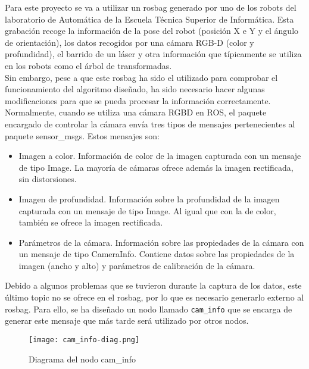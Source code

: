 Para este proyecto se va a utilizar un rosbag generado por uno de los robots del laboratorio de Automática de la Escuela Técnica Superior de Informática. Esta grabación recoge la información de la pose del robot (posición X e Y y el ángulo de orientación), los datos recogidos por una cámara RGB-D (color y profundidad), el barrido de un láser y otra información que típicamente se utiliza en los robots como el árbol de transformadas.\\

Sin embargo, pese a que este rosbag ha sido el utilizado para comprobar el funcionamiento del algoritmo diseñado, ha sido necesario hacer algunas modificaciones para que se pueda procesar la información correctamente.\\

Normalmente, cuando se utiliza una cámara RGBD en ROS, el paquete encargado de controlar la cámara envía tres tipos de mensajes pertenecientes al paquete sensor\_msgs. Estos mensajes son:

\begin{itemize}

	\item Imagen a color. Información de color de la imagen capturada con un mensaje de tipo Image. La mayoría de cámaras ofrece además la imagen rectificada, sin distorsiones.
	\item Imagen de profundidad. Información sobre la profundidad de la imagen capturada con un mensaje de tipo Image. Al igual que con la de color, también se ofrece la imagen rectificada.
	\item Parámetros de la cámara. Información sobre las propiedades de la cámara con un mensaje de tipo CameraInfo. Contiene datos sobre las propiedades de la imagen (ancho y alto) y parámetros de calibración de la cámara.

\end{itemize}

Debido a algunos problemas que se tuvieron durante la captura de los datos, este último topic no se ofrece en el rosbag, por lo que es necesario generarlo externo al rosbag. Para ello, se ha diseñado un nodo llamado \texttt{cam\_info} que se encarga de generar este mensaje que más tarde será utilizado por otros nodos.\\

\begin{figure}[h]
	\begin{center} 
		\texttt{[image: cam\_info-diag.png]}
	\end{center}
	\caption{Diagrama del nodo cam\_info}
	\label{fig:cam_info}
\end{figure}


